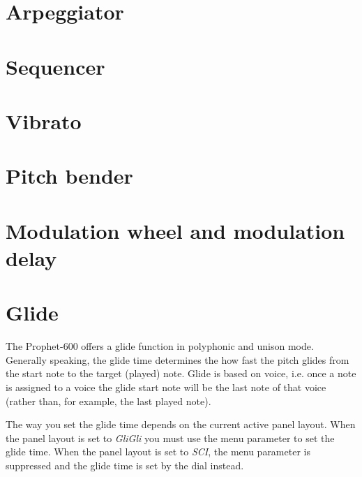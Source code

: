 \documentclass[landscape, 11pt, oneside, twoside]{report}
\newenvironment{flowtext}{\addmargin[0cm]{0cm}}{\endaddmargin} %
\begin{document}
\begin{flowtext}
\pagebreak

\section{Arpeggiator}\label{arp}



\pagebreak

\section{Sequencer}\label{seq}



\section{Vibrato}\label{vib}



\section{Pitch bender}\label{pitchbend}



\section{Modulation wheel and modulation delay}\label{modwheel}



\section{Glide}\label{glide}

The Prophet-600 offers a glide function in polyphonic and unison mode. Generally speaking, the glide time determines the how fast the pitch glides from the start note to the target (played) note. Glide is based on voice, i.e. once a note is assigned to a voice the glide start note will be the last note of that voice (rather than, for example, the last played note). 

The way you set the glide time depends on the current active panel layout. When the panel layout is set to \textit{GliGli} you must use the menu parameter \glide to set the glide time. When the panel layout is set to \textit{SCI}, the menu parameter \glide is suppressed and the glide time is set by the \glidepot dial instead. 


\end{flowtext}
\end{document}
